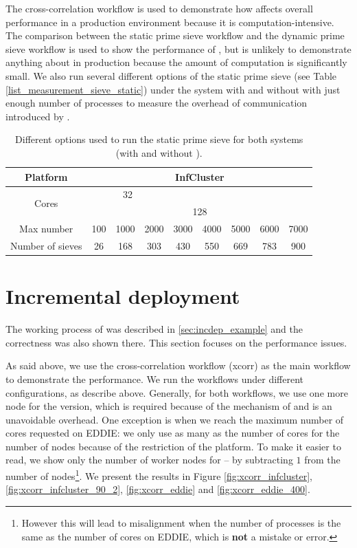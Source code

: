 The cross-correlation workflow is used to demonstrate how \tincdep affects overall performance in a production environment because it is computation-intensive. The comparison between the static prime sieve workflow and the dynamic prime sieve workflow is used to show the performance of \tdynexp, but is unlikely to demonstrate anything about \tincdep in production because the amount of computation is significantly small. We also run several different options of the static prime sieve (see Table \ref{list_measurement_sieve_static}) under the \dpy system with and without \tincdep with just enough number of processes to measure the overhead of communication introduced by \tincdep.

\begin{table}[h]
\centering
\begin{tabular}{ccccccccc}
\hline
Platform & \multicolumn{8}{c}{InfCluster} \\ \hline
\multirow{2}{*}{Cores} &
\multicolumn{3}{c|}{32} \\ \cline{2-9}
& \multicolumn{8}{c}{128} \\ \hline
Max number & 100 & 1000 & 2000 & 3000 & 4000 & 5000 & 6000 & 7000 \\ \hline
Number of sieves & 26 & 168 & 303 & 430 & 550 & 669 & 783 & 900 \\ \hline
\end{tabular}
\caption{Different options used to run the static prime sieve for both systems (with and without \tincdep).}
\label{tbl:list_measurement_sieve_static}
\end{table}

\section{Incremental deployment}
The working process of \tincdep was described in \ref{sec:incdep_example} and the correctness was also shown there. This section focuses on the performance issues.

As said above, we use the cross-correlation workflow (xcorr) as the main workflow to demonstrate the performance. We run the workflows under different configurations, as describe above. Generally, for both workflows, we use one more node for the \tincdep version, which is required because of the mechanism of \tincdep and is an unavoidable overhead. One exception is when we reach the maximum number of cores requested on EDDIE: we only use as many as the number of cores for the number of nodes because of the restriction of the platform. To make it easier to read, we show only the number of worker nodes for \tincdep -- by subtracting $1$ from the number of nodes\footnote{However this will lead to misalignment when the number of processes is the same as the number of cores on EDDIE, which is \textbf{not} a mistake or error.}. We present the results in Figure \ref{fig:xcorr_infcluster}, \ref{fig:xcorr_infcluster_90_2}, \ref{fig:xcorr_eddie} and \ref{fig:xcorr_eddie_400}.

